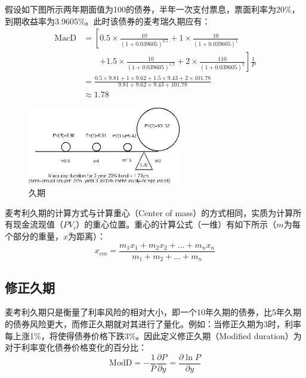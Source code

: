 \documentclass[11pt]{article}
\begin{document}
\begin{example}
    假设如下图所示两年期面值为100的债券，半年一次支付票息，票面利率为20\%，到期收益率为3.9605\%。此时该债券的麦考瑞久期应有：
    \begin{align*}
        \text{MacD} &= \left[ 0.5 \times \frac{10}{(1+0.039605)^{0.5}}
        + 1 \times \frac{10}{(1+0.039605)^{1}} \right. \\
        & \qquad \left. + 1.5 \times \frac{10}{(1+0.039605)^{1.5}}
        + 2 \times \frac{110}{(1+0.039605)^{2}} \right] \frac{1}{P} \\
        &= \frac{0.5 \times 9.81 + 1 \times 9.62 + 1.5 \times 9.43 + 2 \times 101.78}{9.81 + 9.62 + 9.43 + 101.78} \\
        &\approx 1.78
    \end{align*}
\end{example}

\begin{figure}[H]
    \centering
    \includegraphics[width=0.6\textwidth]{fig/duration.jpeg}
    \caption{久期}
    \label{fig:duration}
\end{figure}

麦考利久期的计算方式与计算重心（Center of mass）的方式相同，实质为计算所有现金流现值（$PV_i$）的重心位置。重心的计算公式（一维）有如下所示（$m$为每个部分的重量，$x$为距离）：
\begin{equation*}
    x_{cm} = \frac{m_1 x_1 + m_2 x_2 + \dots + m_n x_n}{m_1 + m_2 + \dots + m_n}
\end{equation*}

\subsection*{修正久期}

麦考利久期只是衡量了利率风险的相对大小，即一个10年久期的债券，比5年久期的债券风险更大，而修正久期就对其进行了量化。例如：当修正久期为3时，利率每上涨1\%，将使得债券价格下跌3\%。因此定义修正久期（Modified duration）为对于利率变化债券价格变化的百分比：
\begin{equation*}
    \text{ModD} = -\frac{1}{P} \frac{\partial P}{\partial y} = \frac{\partial \ln P}{\partial y}
\end{equation*}
\end{document}
